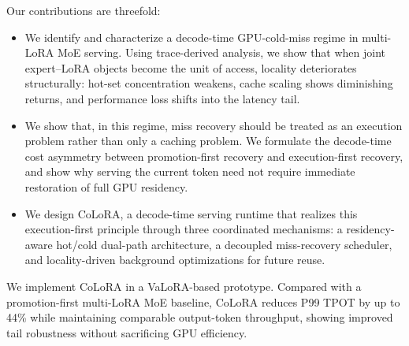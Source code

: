 \documentclass[sigplan,anonymous,review,10pt]{acmart}
\begin{document}
Our contributions are threefold:
\begin{itemize}
    \item We identify and characterize a decode-time GPU-cold-miss regime in multi-LoRA MoE serving. Using trace-derived analysis, we show that when joint expert--LoRA objects become the unit of access, locality deteriorates structurally: hot-set concentration weakens, cache scaling shows diminishing returns, and performance loss shifts into the latency tail. 

    \item We show that, in this regime, miss recovery should be treated as an execution problem rather than only a caching problem. We formulate the decode-time cost asymmetry between promotion-first recovery and execution-first recovery, and show why serving the current token need not require immediate restoration of full GPU residency.

    \item We design CoLoRA, a decode-time serving runtime that realizes this execution-first principle through three coordinated mechanisms: a residency-aware hot/cold dual-path architecture, a decoupled miss-recovery scheduler, and locality-driven background optimizations for future reuse.

\end{itemize}

We implement CoLoRA in a VaLoRA-based prototype. Compared with a promotion-first multi-LoRA MoE baseline, CoLoRA reduces P99 TPOT by up to 44\% while maintaining comparable output-token throughput, showing improved tail robustness without sacrificing GPU efficiency.

\end{document}
